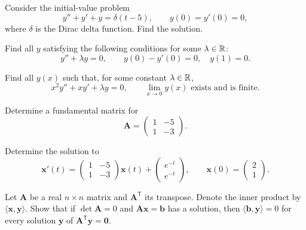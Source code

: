 \documentclass[11pt,oneside]{article}
\begin{document}
\begin{problem}
Consider the initial-value problem
\[y''+y'+y=\delta(t-5),\qquad y(0)=y'(0)=0,\]
where $\delta$ is the Dirac delta function. Find the solution.
\end{problem}

\begin{problem}
Find all $y$ satisfying the following conditions for some $\lambda\in\mathbb{R}$:
\[y''+\lambda y=0,\qquad y(0)-y'(0)=0,\quad y(1)=0.\]
\end{problem}

\begin{problem}
Find all $y(x)$ such that, for some constant $\lambda\in\mathbb{R}$,
\[x^2y''+xy'+\lambda y=0,\qquad\lim_{x\to0}y(x)\text{ exists and is finite}.\]
\end{problem}

\begin{problem}
Determine a fundamental matrix for
\[\mathbf A=\begin{pmatrix}1&-5\\1&-3\end{pmatrix}.\]
\end{problem}

\begin{problem}
Determine the solution to
\[\mathbf x'(t)=\begin{pmatrix}1&-5\\1&-3\end{pmatrix}\mathbf x(t)+\begin{pmatrix}e^{-t}\\e^{-t}\end{pmatrix},\qquad\mathbf x(0)=\begin{pmatrix}2\\1\end{pmatrix}.\]
\end{problem}

\begin{problem}
Let $\mathbf A$ be a real $n\times n$ matrix and $\mathbf A^{\mathsf T}$ its transpose. Denote the inner product by $\langle\mathbf x,\mathbf y\rangle$. Show that if $\det\mathbf A=0$ and $\mathbf A\mathbf x=\mathbf b$ has a solution, then $\langle\mathbf b,\mathbf y\rangle=0$ for every solution $\mathbf y$ of $\mathbf A^{\mathsf T}\mathbf y=\mathbf0$.
\end{problem}
\end{document}
